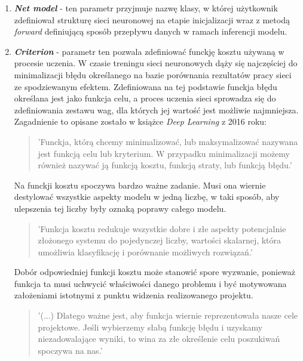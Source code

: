     \begin{enumerate}
    \item \textbf{\textit{Net model}} - ten parametr przyjmuje nazwę klasy, w której użytkownik
    zdefiniował strukturę sieci neuronowej na etapie inicjalizacji wraz z metodą
    \textit{forward} definiującą sposób przepływu danych w ramach inferencji modelu.
    \item \textbf{\textit{Criterion}} - parametr ten pozwala zdefiniować funckję kosztu
    używaną w procesie uczenia. W czasie treningu sieci neuronowych dąży się
    najczęściej do minimalizacji błędu określanego na bazie porównania rezultatów
    pracy sieci ze spodziewanym efektem. Zdefiniowana na tej podstawie funckja błędu
    określana jest jako funkcja celu, a proces uczenia sieci sprowadza się do zdefiniowania
    zestawu wag, dla których jej wartość jest możliwie najmniejsza. Zagadnienie
    to opisane zostało w książce \textit{Deep Learning} \cite{deeplearn} z 2016 roku:

    \begin{quote}
      'Funckja, którą chcemy minimalizować, lub maksymalizować nazywana jest funkcją celu lub kryterium.
      W przypadku minimalizacji możemy również nazywać ją funkcją kosztu, funkcją straty, lub funkcją błędu.'
    \end{quote}

    Na funckji kosztu spoczywa bardzo ważne zadanie. Musi ona wiernie destylować wszystkie
    aspekty modelu w jedną liczbę, w taki sposób, aby ulepszenia tej liczby były
    oznaką poprawy całego modelu. \cite{neuralsmithing}

    \begin{quote}
      'Funkcja kosztu redukuje wszystkie dobre i złe aspekty potencjalnie złożonego
      systemu do pojedynczej liczby, wartości skalarnej, która umożliwia
      klasyfikację i porównanie możliwych rozwiązań.'
    \end{quote}

    Dobór odpowiedniej funkcji kosztu może stanowić spore wyzwanie, ponieważ funkcja
    ta musi uchwycić właściwości danego problemu i być motywowana założeniami
    istotnymi z punktu widzenia realizowanego projektu. \cite{neuralsmithing}

    \begin{quote}
      '(...) Dlatego ważne jest, aby funkcja wiernie reprezentowała nasze cele projektowe.
      Jeśli wybierzemy słabą funkcję błędu i uzyskamy niezadowalające wyniki, to
      wina za złe określenie celu poszukiwań spoczywa na nas.'
    \end{quote}


\end{enumerate}
